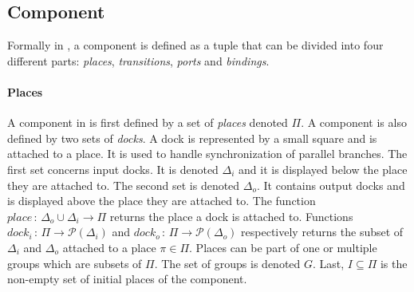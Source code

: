 \subsection{Component}

Formally in \mad, a component is defined as a tuple that can be divided
into four different parts: \emph{places}, \emph{transitions}, \emph{ports} and
\emph{bindings}.

\paragraph{Places}{

A component in \mad is first defined by a set of \emph{places} denoted
$\Pi$. A component is also defined by two sets of
\emph{docks}. A dock is represented by a small square and is attached to a
place. It is used to handle synchronization of parallel branches. The
first set concerns input docks. It is denoted $\Delta_{i}$ and it is
displayed below the place they are attached to. The second set is
denoted $\Delta_{o}$. It contains output docks and is displayed above
the place they are attached to.
The function $place\,:\,\Delta_{o}\cup\Delta_{i}\rightarrow\Pi$
returns the place a dock is attached to. Functions
$dock_i\,:\,\Pi\rightarrow \mathcal{P}(\Delta_{i})$ and
$dock_o\,:\,\Pi\rightarrow \mathcal{P}(\Delta_{o})$ respectively
returns the subset of $\Delta_i$ and $\Delta_o$ attached to a place
$\pi\in\Pi$. Places can be part of one or multiple groups which are
subsets of $\Pi$. The set of groups is denoted $G$. Last, $I \subseteq \Pi$ is the
non-empty set of initial places of the component.

}

